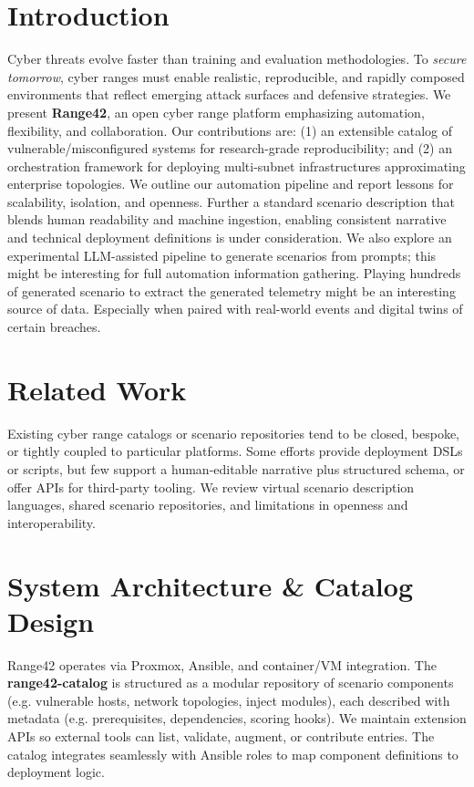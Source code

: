 \documentclass[11pt]{article}
\begin{document}
\section{Introduction}
Cyber threats evolve faster than training and evaluation methodologies. To \emph{secure tomorrow}, cyber ranges must enable realistic, reproducible, and rapidly composed environments that reflect emerging attack surfaces and defensive strategies. We present \textbf{Range42}, an open cyber range platform emphasizing automation, flexibility, and collaboration. Our contributions are: (1) an extensible catalog of vulnerable/misconfigured systems for research-grade reproducibility; and (2) an orchestration framework for deploying multi-subnet infrastructures approximating enterprise topologies. We outline our automation pipeline and report lessons for scalability, isolation, and openness.
Further a standard scenario description that blends human readability and machine ingestion, enabling consistent narrative and technical deployment definitions is under consideration. We also explore an experimental LLM-assisted pipeline to generate scenarios from prompts; this might be interesting for full automation information gathering. Playing hundreds of generated scenario to extract the generated telemetry might be an interesting source of data. Especially when paired with real-world events and digital twins of certain breaches.


\section{Related Work}
Existing cyber range catalogs or scenario repositories tend to be closed, bespoke, or tightly coupled to particular platforms. Some efforts provide deployment DSLs or scripts, but few support a human-editable narrative plus structured schema, or offer APIs for third-party tooling. We review virtual scenario description languages, shared scenario repositories, and limitations in openness and interoperability.

\section{System Architecture \& Catalog Design}
Range42 operates via Proxmox, Ansible, and container/VM integration.  
The \textbf{range42-catalog} is structured as a modular repository of scenario components (e.g. vulnerable hosts, network topologies, inject modules), each described with metadata (e.g. prerequisites, dependencies, scoring hooks). We maintain extension APIs so external tools can list, validate, augment, or contribute entries. The catalog integrates seamlessly with Ansible roles to map component definitions to deployment logic.
\end{document}
